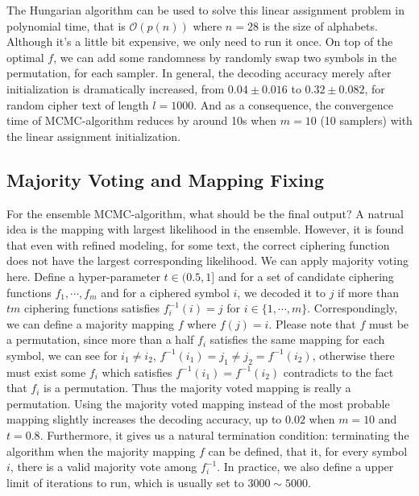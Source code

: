 \documentclass[10pt, twocolumn]{article}
\begin{document}
The Hungarian algorithm can be used to solve this linear assignment problem in polynomial time, that is $\mathcal{O}(p(n))$ where $n=28$ is the size of alphabets. Although it's a little bit expensive, we only need to run it once. On top of the optimal $f$, we can add some randomness by randomly swap two symbols in the permutation, for each sampler. In general, the decoding accuracy merely after initialization is dramatically increased, from $0.04\pm0.016$  to $0.32\pm0.082$, for random cipher text of length $l=1000$. And as a consequence, the convergence time of MCMC-algorithm reduces by around 10s when $m=10$ (10 samplers) with the linear assignment initialization.

\subsection{\label{subsec2.4}Majority Voting and Mapping Fixing}
For the ensemble MCMC-algorithm, what should be the final output? A natrual idea is the mapping with largest likelihood in the ensemble. However, it is found that even with refined modeling, for some text, the correct ciphering function does not have the largest corresponding likelihood. We can apply majority voting here. Define a hyper-parameter $t\in(0.5,1]$ and for a set of candidate ciphering functions $f_1, \cdots, f_m$ and for a ciphered symbol $i$, we decoded it to $j$ if more than $tm$ ciphering functions satisfies $f_i^{-1}(i) = j$ for $i\in\{1, \cdots, m\}$. Correspondingly, we can define a majority mapping $f$ where $f(j) = i$. Please note that $f$ must be a permutation, since more than a half $f_i$ satisfies the same mapping for each symbol, we can see for $i_1\neq i_2$, $f^{-1}(i_1) = j_1 \neq j_2 = f^{-1}(i_2)$, otherwise there must exist some $f_i$ which satisfies $f^{-1}(i_1) = f^{-1}(i_2)$ contradicts to the fact that $f_i$ is a permutation. Thus the majority voted mapping is really a permutation. Using the majority voted mapping instead of the most probable mapping slightly increases the decoding accuracy, up to $0.02$ when $m=10$ and $t=0.8$. Furthermore, it gives us a natural termination condition: terminating the algorithm when the majority mapping $f$ can be defined, that it, for every symbol $i$, there is a valid majority vote among $f_i^{-1}$. In practice, we also define a upper limit of iterations to run, which is usually set to $3000\sim5000$.
\end{document}
